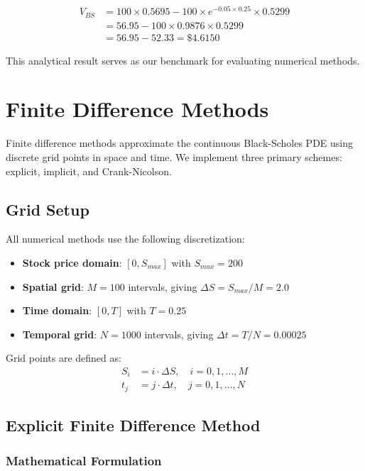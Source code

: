 \documentclass[12pt,a4paper]{article}
\numberwithin{algorithm}{subsection}
\begin{document}
\begin{align}
V_{BS} &= 100 \times 0.5695 - 100 \times e^{-0.05 \times 0.25} \times 0.5299 \\
       &= 56.95 - 100 \times 0.9876 \times 0.5299 \\
       &= 56.95 - 52.33 = \$4.6150
\end{align}

This analytical result serves as our benchmark for evaluating numerical methods.

\section{Finite Difference Methods}
\label{sec:fdm-methods}

Finite difference methods approximate the continuous Black-Scholes PDE using discrete grid points in space and time. We implement three primary schemes: explicit, implicit, and Crank-Nicolson.

\subsection{Grid Setup}

All numerical methods use the following discretization:

\begin{itemize}
\item \textbf{Stock price domain}: $[0, S_{max}]$ with $S_{max} = \num{200}$
\item \textbf{Spatial grid}: $M = \num{100}$ intervals, giving $\Delta S = S_{max}/M = \num{2.0}$
\item \textbf{Time domain}: $[0, T]$ with $T = 0.25$
\item \textbf{Temporal grid}: $N = \num{1000}$ intervals, giving $\Delta t = T/N = \num{0.00025}$
\end{itemize}

Grid points are defined as:
\begin{align}
S_i &= i \cdot \Delta S, \quad i = 0, 1, \ldots, M \\
t_j &= j \cdot \Delta t, \quad j = 0, 1, \ldots, N
\end{align}

\subsection{Explicit Finite Difference Method}

\subsubsection{Mathematical Formulation}
\end{document}

